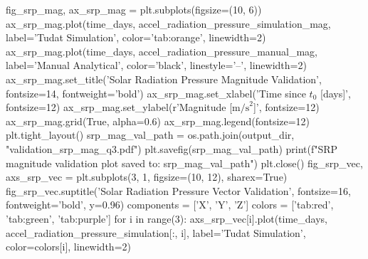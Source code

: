 {}
\markdownRendererSectionEnd \markdownRendererSectionBegin
\markdownRendererHeadingOne{-------------------------------------------------------------------------}\markdownRendererInterblockSeparator
{}
\markdownRendererSectionEnd \markdownRendererSectionBegin
{}\markdownRendererInterblockSeparator
{}
\markdownRendererSectionEnd \markdownRendererSectionBegin
\markdownRendererHeadingOne{-------------------------------------------------------------------------}\markdownRendererInterblockSeparator
{}fig_srp_mag, ax_srp_mag = plt.subplots(figsize=(10, 6)) ax_srp_mag.plot(time_days, accel_radiation_pressure_simulation_mag, label='Tudat Simulation', color='tab:orange', linewidth=2) ax_srp_mag.plot(time_days, accel_radiation_pressure_manual_mag, label='Manual Analytical', color='black', linestyle='--', linewidth=2) ax_srp_mag.set_title('Solar Radiation Pressure Magnitude Validation', fontsize=14, fontweight='bold') ax_srp_mag.set_xlabel('Time since $t_0$ [days]', fontsize=12) ax_srp_mag.set_ylabel(r'Magnitude [$\mathrm{m/s}^2$]', fontsize=12) ax_srp_mag.grid(True, alpha=0.6) ax_srp_mag.legend(fontsize=12) plt.tight_layout() srp_mag_val_path = os.path.join(output_dir, "validation_srp_mag_q3.pdf") plt.savefig(srp_mag_val_path) print(f"SRP magnitude validation plot saved to: {srp_mag_val_path}") plt.close()\markdownRendererInterblockSeparator
{}
\markdownRendererSectionEnd \markdownRendererSectionBegin
\markdownRendererHeadingOne{-------------------------------------------------------------------------}\markdownRendererInterblockSeparator
{}
\markdownRendererSectionEnd \markdownRendererSectionBegin
{}\markdownRendererInterblockSeparator
{}
\markdownRendererSectionEnd \markdownRendererSectionBegin
\markdownRendererHeadingOne{-------------------------------------------------------------------------}\markdownRendererInterblockSeparator
{}fig_srp_vec, axs_srp_vec = plt.subplots(3, 1, figsize=(10, 12), sharex=True) fig_srp_vec.suptitle('Solar Radiation Pressure Vector Validation', fontsize=16, fontweight='bold', y=0.96) components = ['X', 'Y', 'Z'] colors = ['tab:red', 'tab:green', 'tab:purple'] for i in range(3):\markdownRendererInterblockSeparator
{}
\markdownRendererSectionEnd \markdownRendererSectionBegin
{}\markdownRendererInterblockSeparator
{}axs_srp_vec[i].plot(time_days, accel_radiation_pressure_simulation[:, i], label='Tudat Simulation', color=colors[i], linewidth=2)\markdownRendererInterblockSeparator
